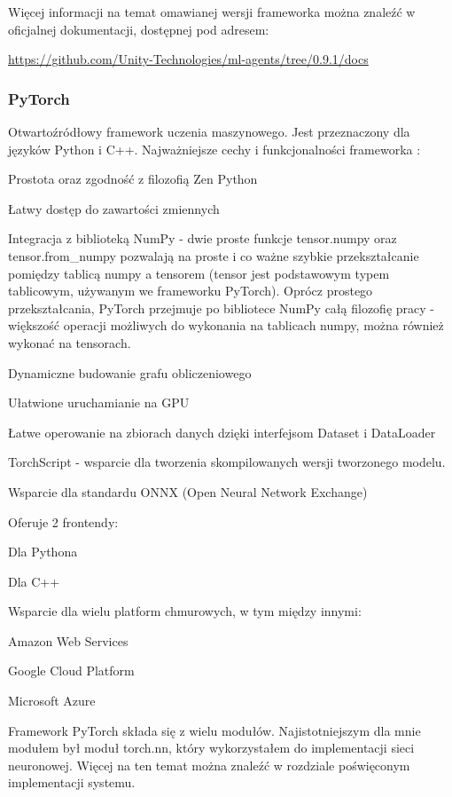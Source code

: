 Więcej informacji na temat omawianej wersji frameworka można znaleźć w oficjalnej dokumentacji, dostępnej pod adresem:
\begin{center}
\url{https://github.com/Unity-Technologies/ml-agents/tree/0.9.1/docs}
\end{center}

\subsubsection{PyTorch}
Otwartoźródłowy framework uczenia maszynowego. Jest przeznaczony dla języków Python i C++.
Najważniejsze cechy i funkcjonalności frameworka \cite{pytorch:features}\cite{pytorch:vs:tensorflow}:
\begin{enumerate*}
\item Prostota oraz zgodność z filozofią Zen Python \cite{python:zen}
\item Łatwy dostęp do zawartości zmiennych
\item Integracja z biblioteką NumPy - dwie proste funkcje tensor.numpy oraz tensor.from\_numpy pozwalają na proste i co ważne szybkie przekształcanie pomiędzy tablicą numpy a tensorem (tensor jest podstawowym typem tablicowym, używanym we frameworku PyTorch). Oprócz prostego przekształcania, PyTorch przejmuje po bibliotece NumPy całą filozofię pracy - większość operacji możliwych do wykonania na tablicach numpy, można również wykonać na tensorach.
\item Dynamiczne budowanie grafu obliczeniowego \cite{pytorch:understandingGraphs}
\item Ułatwione uruchamianie na GPU
\item Łatwe operowanie na zbiorach danych dzięki interfejsom Dataset i DataLoader
\item TorchScript - wsparcie dla tworzenia skompilowanych wersji tworzonego modelu.
\item Wsparcie dla standardu ONNX (Open Neural Network Exchange)
\item Oferuje 2 frontendy:
\begin{itemize*}
\item Dla Pythona
\item Dla C++
\end{itemize*}
\item Wsparcie dla wielu platform chmurowych, w tym między innymi:
\begin{itemize*}
\item Amazon Web Services
\item Google Cloud Platform
\item Microsoft Azure
\end{itemize*}
\end{enumerate*}
Framework PyTorch składa się z wielu modułów. Najistotniejszym dla mnie modułem był moduł torch.nn, który wykorzystałem do implementacji sieci neuronowej. Więcej na ten temat można znaleźć w rozdziale poświęconym implementacji systemu.

